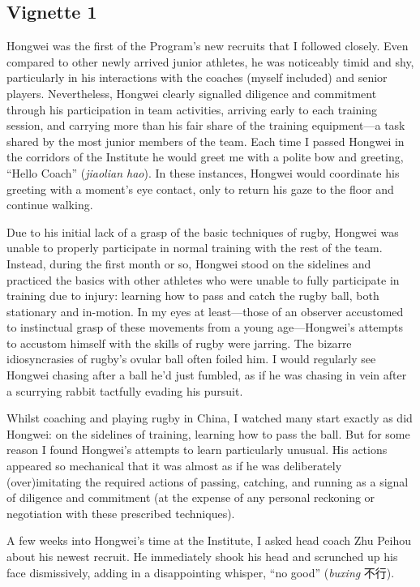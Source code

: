 \subsection{Vignette 1}
Hongwei was the first of the Program’s new recruits that I followed closely. Even compared to other newly arrived junior athletes, he was noticeably timid and shy, particularly in his interactions with the coaches (myself included) and senior players. Nevertheless, Hongwei clearly signalled diligence and commitment through his participation in team activities, arriving early to each training session, and carrying more than his fair share of the training equipment---a task shared by the most junior members of the team.  Each time I passed Hongwei in the corridors of the Institute he would greet me with a polite bow and greeting, ``Hello Coach'' (\textit{jiaolian hao}).  In these instances, Hongwei would coordinate his greeting with a moment's eye contact, only to return his gaze to the floor and continue walking.

Due to his initial lack of a grasp of the basic techniques of rugby, Hongwei was unable to properly participate in normal training with the rest of the team. Instead, during the first month or so, Hongwei stood on the sidelines and practiced the basics with other athletes who were unable to fully participate in training due to injury: learning how to pass and catch the rugby ball, both stationary and in-motion. In my eyes at least---those of an observer accustomed to instinctual grasp of these movements from a young age---Hongwei's attempts to accustom himself with the skills of rugby were jarring.  The bizarre idiosyncrasies of rugby's ovular ball often foiled him. I would regularly see Hongwei chasing after a ball he'd just fumbled, as if he was chasing in vein after a scurrying rabbit tactfully evading his pursuit.

Whilst coaching and playing rugby in China, I watched many start exactly as did Hongwei: on the sidelines of training, learning how to pass the ball. But for some reason I found Hongwei’s attempts to learn particularly unusual.  His actions appeared so mechanical that it was almost as if he was deliberately (over)imitating the required actions of passing, catching, and running as a signal of diligence and commitment (at the expense of any personal reckoning or negotiation with these prescribed techniques).


A few weeks into Hongwei’s time at the Institute, I asked head coach Zhu Peihou about his newest recruit.  He immediately shook his head and scrunched up his face dismissively, adding in a disappointing whisper, ``no good'' (\textit{buxing} 不行).

